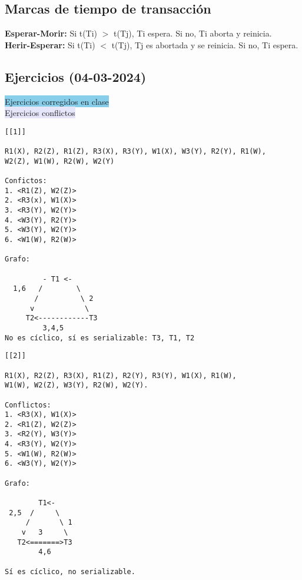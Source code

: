 \documentclass{article}
\begin{document}
\subsection{Marcas de tiempo de transacción}
\textbf{Esperar-Morir:} Si t(Ti) $>$ t(Tj), Ti espera. Si no, Ti aborta y reinicia.\\
\textbf{Herir-Esperar:} Si t(Ti) $<$ t(Tj), Tj es abortada y se reinicia. Si no, Ti espera. 
\subsection{Ejercicios (04-03-2024)}
\colorbox{SkyBlue}{Ejercicios corregidos en clase}\\
\colorbox{Lavender}{Ejercicios conflictos}
\begin{verbatim}
[[1]]

R1(X), R2(Z), R1(Z), R3(X), R3(Y), W1(X), W3(Y), R2(Y), R1(W),
W2(Z), W1(W), R2(W), W2(Y)

Confictos:
1. <R1(Z), W2(Z)>
2. <R3(x), W1(X)>
3. <R3(Y), W2(Y)>
4. <W3(Y), R2(Y)>
5. <W3(Y), W2(Y)>
6. <W1(W), R2(W)>

Grafo:

         - T1 <-
  1,6   /        \
       /          \ 2
      v            \
     T2<------------T3
         3,4,5
No es cíclico, sí es serializable: T3, T1, T2
\end{verbatim}

\begin{verbatim}
[[2]]

R1(X), R2(Z), R3(X), R1(Z), R2(Y), R3(Y), W1(X), R1(W),
W1(W), W2(Z), W3(Y), R2(W), W2(Y).

Conflictos:
1. <R3(X), W1(X)>
2. <R1(Z), W2(Z)>
3. <R2(Y), W3(Y)>
4. <R3(Y), W2(Y)>
5. <W1(W), R2(W)>
6. <W3(Y), W2(Y)>

Grafo:

        T1<- 
 2,5  /     \      
     /       \ 1
    v   3     \
   T2<=======>T3    
        4,6
       
Sí es cíclico, no serializable.        
\end{verbatim}
\end{document}
